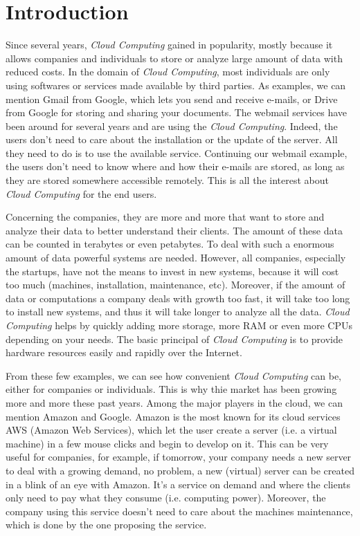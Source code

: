 

\chapter{Introduction}
Since several years, \textit{Cloud Computing} gained in popularity, mostly because it allows companies and individuals to store or analyze large amount of data with reduced costs. 
In the domain of \textit{Cloud Computing}, most individuals are only using softwares or services made available by third parties. 
As examples, we can mention Gmail from Google, which lets you send and receive e-mails, or Drive from Google for storing and sharing your documents. 
The webmail services have been around for several years and are using the \textit{Cloud Computing}. 
Indeed, the users don't need to care about the installation or the update of the server. 
All they need to do is to use the available service. Continuing our webmail example, the users don't need to know where and how their e-mails are stored, as long as they are stored somewhere accessible remotely. This is all the interest about \textit{Cloud Computing} for the end users.

Concerning the companies, they are more and more that want to store and analyze their data to better understand their clients. 
The amount of these data can be counted in terabytes or even petabytes. 
To deal with such a enormous amount of data powerful systems are needed. 
However, all companies, especially the startups, have not the means to invest in new systems, because it will cost too much (machines, installation, maintenance, etc). 
Moreover, if the amount of data or computations a company deals with growth too fast, it will take too long to install new systems, and thus it will take longer to analyze all the data. 
\textit{Cloud Computing} helps by quickly adding more storage, more RAM or even more CPUs depending on your needs. 
The basic principal of \textit{Cloud Computing} is to provide hardware resources easily and rapidly over the Internet.

From these few examples, we can see how convenient \textit{Cloud Computing} can be, either for companies or individuals. 
This is why thie market has been growing more and more these past years. 
Among the major players in the cloud, we can mention Amazon and Google. 
Amazon is the most known for its cloud services AWS (Amazon Web Services), which let the user create a server (i.e. a virtual machine) in a few mouse clicks and begin to develop on it. 
This can be very useful for companies, for example, if tomorrow, your company needs a new server to deal with a growing demand, no problem, a new (virtual) server can be created in a blink of an eye with Amazon. 
It's a service on demand and where the clients only need to pay what they consume (i.e. computing power). 
Moreover, the company using this service doesn't need to care about the machines maintenance, which is done by the one proposing the service.



